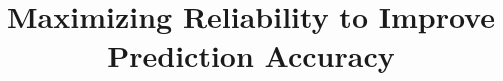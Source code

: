 \documentclass[11pt,journal,compsoc]{IEEEtran}
\begin{document}
%
\title{Maximizing Reliability to Improve Prediction Accuracy}
%
%
%
%


\end{document}
